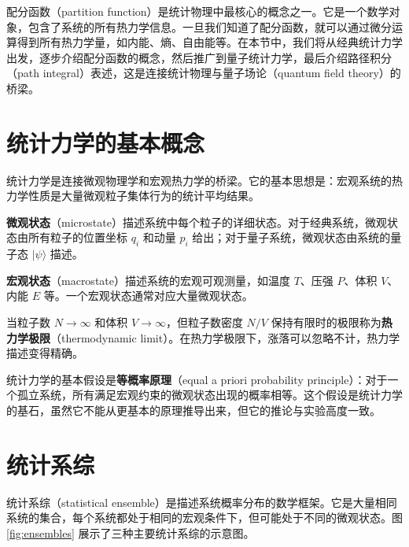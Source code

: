 
配分函数（partition function）是统计物理中最核心的概念之一。它是一个数学对象，包含了系统的所有热力学信息。一旦我们知道了配分函数，就可以通过微分运算得到所有热力学量，如内能、熵、自由能等。在本节中，我们将从经典统计力学出发，逐步介绍配分函数的概念，然后推广到量子统计力学，最后介绍路径积分（path integral）表述，这是连接统计物理与量子场论（quantum field theory）的桥梁。

\section{统计力学的基本概念}

统计力学是连接微观物理学和宏观热力学的桥梁。它的基本思想是：宏观系统的热力学性质是大量微观粒子集体行为的统计平均结果。

\begin{definition}[微观状态与宏观状态]
\textbf{微观状态}（microstate）描述系统中每个粒子的详细状态。对于经典系统，微观状态由所有粒子的位置坐标 $q_i$ 和动量 $p_i$ 给出；对于量子系统，微观状态由系统的量子态 $|\psi\rangle$ 描述。

\textbf{宏观状态}（macrostate）描述系统的宏观可观测量，如温度 $T$、压强 $P$、体积 $V$、内能 $E$ 等。一个宏观状态通常对应大量微观状态。
\end{definition}

\begin{definition}[热力学极限]
当粒子数 $N \to \infty$ 和体积 $V \to \infty$，但粒子数密度 $N/V$ 保持有限时的极限称为\textbf{热力学极限}（thermodynamic limit）。在热力学极限下，涨落可以忽略不计，热力学描述变得精确。
\end{definition}

\begin{note}
统计力学的基本假设是\textbf{等概率原理}（equal a priori probability principle）：对于一个孤立系统，所有满足宏观约束的微观状态出现的概率相等。这个假设是统计力学的基石，虽然它不能从更基本的原理推导出来，但它的推论与实验高度一致。
\end{note}

\section{统计系综}

统计系综（statistical ensemble）是描述系统概率分布的数学框架。它是大量相同系统的集合，每个系统都处于相同的宏观条件下，但可能处于不同的微观状态。图 \ref{fig:ensembles} 展示了三种主要统计系综的示意图。

